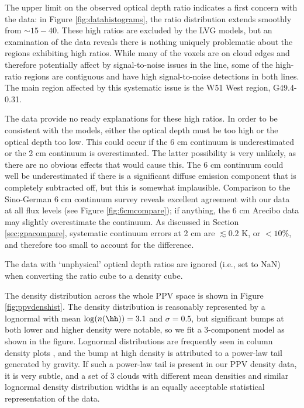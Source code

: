 The upper limit on the observed optical depth ratio indicates a first concern
with the data: in Figure \ref{fig:datahistograms}, the ratio distribution
extends smoothly from $\sim15-40$.  These high ratios are excluded by the LVG
models, but an examination of the data reveals there is nothing uniquely
problematic about the regions exhibiting high ratios.  While many of the voxels
are on cloud edges and therefore potentially affect by signal-to-noise issues
in the \twotwo line, some of the high-ratio regions are contiguous and have
high signal-to-noise detections in both lines.  The main region affected by
this systematic issue is the W51 West region, G49.4-0.31.

The data provide no ready explanations for these high ratios.  In order to
be consistent with the models, either the \oneone optical depth must be
too high or the \twotwo optical depth too low.  This could occur if the
6 cm continuum is underestimated or the 2 cm continuum is overestimated.
The latter possibility is very unlikely, as there are no obvious effects that
would cause this.  The 6 cm continuum could well be underestimated if there
is a significant diffuse emission component that is completely subtracted off,
but this is somewhat implausible.  Comparison to the Sino-German 6 cm continuum
survey \citep{Sun2007a,Sun2011b} reveals excellent agreement with our data at
all flux levels (see Figure \ref{fig:6cmcompare}); if anything, the 6 cm
Arecibo data may slightly overestimate the continuum.
As discussed in Section \ref{sec:gpacompare}, systematic continuum errors at 2
cm are $\lesssim 0.2$ K, or $<10\%$, and therefore too small to account for the
difference.

The data with `unphysical' optical depth ratios are ignored (i.e., set to NaN)
when converting the ratio cube to a density cube.

The density distribution across the whole PPV space is shown in Figure
\ref{fig:ppvdenshist}.  The density distribution
is reasonably represented by a lognormal with mean $\log(n(\hh))=3.1$ and
$\sigma=0.5$, but significant bumps at both lower and higher density were
notable, so we fit a 3-component model as shown in the figure.
Lognormal distributions are frequently seen in column density plots
\citep[e.g.]{Kainulainen2011a,Schneider2013a}, and the bump at high density is
attributed to a power-law tail generated by gravity.  If such a power-law tail
is present in our PPV density data, it is very subtle, and a set of 3 clouds
with different mean densities and similar lognormal density distribution widths
is an equally acceptable statistical representation of the data.

